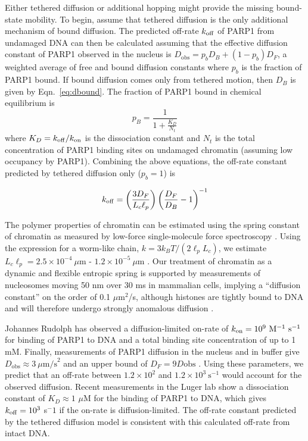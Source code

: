 Either tethered diffusion or additional hopping might provide the missing bound-state mobility.  To begin, assume that tethered diffusion is the only additional mechanism of bound diffusion.  The predicted off-rate $k_{\rm off}$ of PARP1 from undamaged DNA can then be calculated assuming that the effective diffusion constant of PARP1 observed in the nucleus is $D_\mathrm{obs} = p_b D_B + (1-p_b)D_F$, a weighted average of free and bound diffusion constants where $p_b$ is the fraction of PARP1 bound.  If bound diffusion comes only from tethered motion, then $D_B$ is given by Eqn.~\ref{eq:dbound}.  The fraction of PARP1 bound in chemical equilibrium is 
\begin{equation*}
p_B = \frac{1}{1+\frac{K_D}{N_t}} 
\end{equation*} where $K_D = k_{\rm off}/k_{\rm on}$ is the dissociation constant and $N_t$ is the total concentration of PARP1 binding sites on undamaged chromatin (assuming low occupancy by PARP1).  Combining the above equations, the off-rate constant predicted by tethered diffusion only ($p_b = 1$) is

\begin{equation}
k_{\rm off} = \left(\frac{3D_F}{L_c\ell_p}\right)\left(\frac{D_F}{D_B}-1\right)^{-1}
\end{equation}

The polymer properties of chromatin can be estimated using the spring constant of chromatin as measured by low-force single-molecule force spectroscopy \cite{kruithof09, norouzi18}.  Using the expression for a worm-like chain, $k = 3 k_B T/(2\ell_pL_c)$, we estimate  $L_c\ell_p = 2.5\times10^{-4}\ \mu$m  - $1.2\times 10^{-5}\ \mu$m \cite{howard01}.  Our treatment of chromatin as a dynamic and flexible entropic spring is supported by measurements of nucleosomes moving 50 nm over 30 ms in mammalian cells, implying a ``diffusion constant'' on the order of 0.1 $\mu$m$^2$/s, although histones are tightly bound to DNA and will therefore undergo strongly anomalous diffusion \cite{nozaki17,maeshima16,hihara12,nozaki13}.

Johannes Rudolph has observed a diffusion-limited on-rate of $\kon = 10^{9}\ \mathrm{M}^{-1}\ \mathrm{s}^{-1}$ for binding of PARP1 to DNA and a total binding site concentration of up to 1 mM.    Finally, measurements of PARP1 diffusion in the nucleus and in buffer give $D_\mathrm{obs} \approx 3\ \mu\mathrm{m/s}^2$ and an upper bound of $D_F = 9D\mathrm{obs}$ \cite{mahadevan18}.  Using these parameters, we predict that an off-rate between $1.2\times 10^2$ and $1.2\times 10^3\ \mathrm{s}^{-1}$ would account for the observed diffusion.  Recent measurements in the Luger lab show a dissociation constant of $K_D \approx 1$ $\mu$M for the binding of PARP1 to DNA, which gives $k_{\rm off} = 10^3$ s$^-1$ if the on-rate is diffusion-limited.  The off-rate constant predicted by the tethered diffusion model is consistent with this calculated off-rate from intact DNA.

